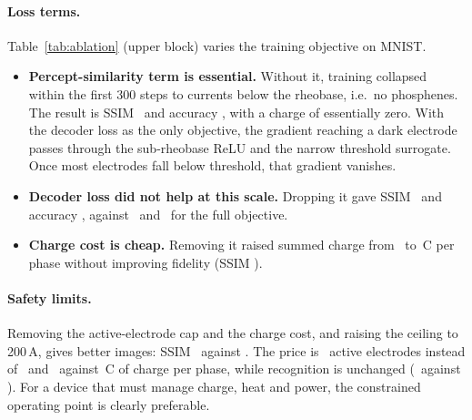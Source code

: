 \paragraph{Loss terms.} Table~\ref{tab:ablation} (upper block) varies the training objective on MNIST.
\begin{itemize}
\item \textbf{Percept-similarity term is essential.} Without it, training collapsed within the first 300 steps to currents below the rheobase, i.e.\ no phosphenes. The result is SSIM \AbNoPerSsim\ and accuracy \AbNoPerAcc, with a charge of essentially zero. With the decoder loss as the only objective, the gradient reaching a dark electrode passes through the sub-rheobase ReLU and the narrow threshold surrogate. Once most electrodes fall below threshold, that gradient vanishes.
\item \textbf{Decoder loss did not help at this scale.} Dropping it gave SSIM \AbNoRecSsim\ and accuracy \AbNoRecAcc, against \AbMainSsim\ and \AbMainAcc\ for the full objective.
\item \textbf{Charge cost is cheap.} Removing it raised summed charge from \AbMainCharge\ to \AbNoChgCharge\,\textmu C per phase without improving fidelity (SSIM \AbNoChgSsim).
\end{itemize}

\paragraph{Safety limits.} Removing the active-electrode cap and the charge cost, and raising the ceiling to 200\,\textmu A, gives better images: SSIM \AbUnconSsim\ against \AbMainSsim. The price is \AbUnconActive\ active electrodes instead of \AbMainActive\ and \AbUnconCharge\ against \AbMainCharge\,\textmu C of charge per phase, while recognition is unchanged (\AbUnconAcc\ against \AbMainAcc). For a device that must manage charge, heat and power, the constrained operating point is clearly preferable.

